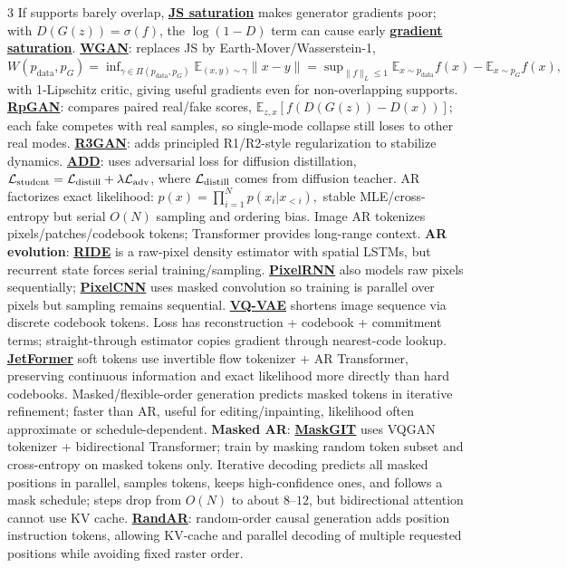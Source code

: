 \documentclass{article}
\numberwithin{equation}{subsection}
\newcommand{\key}[1]{\textbf{#1}}
\newcommand{\lowterm}[1]{\textbf{\underline{#1}}}
\newcommand{\E}{\mathbb{E}}
\begin{document}
\begin{multicols*}{3}
If supports barely overlap, \lowterm{JS saturation} makes generator gradients poor; with $D(G(z))=\sigma(f)$, the $\log(1-D)$ term can cause early \lowterm{gradient saturation}. \lowterm{WGAN}: replaces JS by Earth-Mover/Wasserstein-1,
\(
W(p_{\text{data}},p_G)=
\inf_{\gamma\in\Pi(p_{\text{data}},p_G)}\E_{(x,y)\sim\gamma}\|x-y\|
=\sup_{\|f\|_L\le1}\E_{x\sim p_{\text{data}}}f(x)-\E_{x\sim p_G}f(x),
\)
with 1-Lipschitz critic, giving useful gradients even for non-overlapping supports. \lowterm{RpGAN}: compares paired real/fake scores, $\E_{z,x}[f(D(G(z))-D(x))]$; each fake competes with real samples, so single-mode collapse still loses to other real modes. \lowterm{R3GAN}: adds principled R1/R2-style regularization to stabilize dynamics. \lowterm{ADD}: uses adversarial loss for diffusion distillation, $\mathcal L_{\rm student}=\mathcal L_{\rm distill}+\lambda\mathcal L_{\rm adv}$, where $\mathcal L_{\rm distill}$ comes from diffusion teacher. AR factorizes exact likelihood:
\(
p(x)=\prod_{i=1}^N p(x_i|x_{<i}),
\)
stable MLE/cross-entropy but serial $O(N)$ sampling and ordering bias. Image AR tokenizes pixels/patches/codebook tokens; Transformer provides long-range context. \key{AR evolution}: \lowterm{RIDE} is a raw-pixel density estimator with spatial LSTMs, but recurrent state forces serial training/sampling. \lowterm{PixelRNN} also models raw pixels sequentially; \lowterm{PixelCNN} uses masked convolution so training is parallel over pixels but sampling remains sequential. \lowterm{VQ-VAE} shortens image sequence via discrete codebook tokens. Loss has reconstruction + codebook + commitment terms; straight-through estimator copies gradient through nearest-code lookup. \lowterm{JetFormer} soft tokens use invertible flow tokenizer + AR Transformer, preserving continuous information and exact likelihood more directly than hard codebooks.
Masked/flexible-order generation predicts masked tokens in iterative refinement; faster than AR, useful for editing/inpainting, likelihood often approximate or schedule-dependent. \key{Masked AR}: \lowterm{MaskGIT} uses VQGAN tokenizer + bidirectional Transformer; train by masking random token subset and cross-entropy on masked tokens only. Iterative decoding predicts all masked positions in parallel, samples tokens, keeps high-confidence ones, and follows a mask schedule; steps drop from $O(N)$ to about $8$--$12$, but bidirectional attention cannot use KV cache. \lowterm{RandAR}: random-order causal generation adds position instruction tokens, allowing KV-cache and parallel decoding of multiple requested positions while avoiding fixed raster order. 
\end{multicols*}
\end{document}
